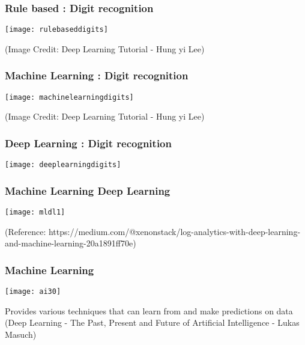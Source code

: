 \begin{frame}[fragile] \frametitle{Rule based : Digit recognition}
\begin{center}
\texttt{[image: rulebaseddigits]}
\end{center}

{\tiny (Image Credit: Deep Learning Tutorial - Hung yi Lee)}


\end{frame}

\begin{frame}[fragile] \frametitle{Machine Learning : Digit recognition}
\begin{center}
\texttt{[image: machinelearningdigits]}
\end{center}
{\tiny (Image Credit: Deep Learning Tutorial - Hung yi Lee)}
\end{frame}

\begin{frame}[fragile] \frametitle{Deep Learning : Digit recognition}
\begin{center}
\texttt{[image: deeplearningdigits]}
\end{center}

\end{frame}

\begin{frame}[fragile]\frametitle{Machine Learning Deep Learning}
\begin{center}
\texttt{[image: mldl1]}
\end{center}
\tiny{(Reference: https://medium.com/@xenonstack/log-analytics-with-deep-learning-and-machine-learning-20a1891ff70e)}
\end{frame}

\begin{frame}[fragile] \frametitle{Machine Learning}
\begin{center}
\texttt{[image: ai30]}
\end{center}
Provides various techniques that can learn from and make predictions on data
{\tiny (Deep Learning - The Past, Present and Future of Artificial Intelligence - Lukas Masuch)}
\end{frame}

